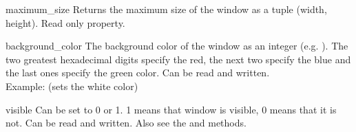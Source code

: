 \begin{memberdesc}[TopWindow]{maximum_size}
Returns the maximum size of the window as a tuple (width, height). Read only 
property.
\end{memberdesc}

\begin{memberdesc}[TopWindow]{background_color}
The background color of the window as an integer (e.g. ). The two 
greatest hexadecimal digits specify the red, the next two specify the blue and 
the last ones specify the green color. Can be read and written.
\\Example: 
 (sets the white color)
\end{memberdesc}

\begin{memberdesc}[TopWindow]{visible}
Can be set to 0 or 1. 1 means that window is visible, 0 means that it is not. 
Can be read and written. Also see the  and  methods.
\end{memberdesc}
